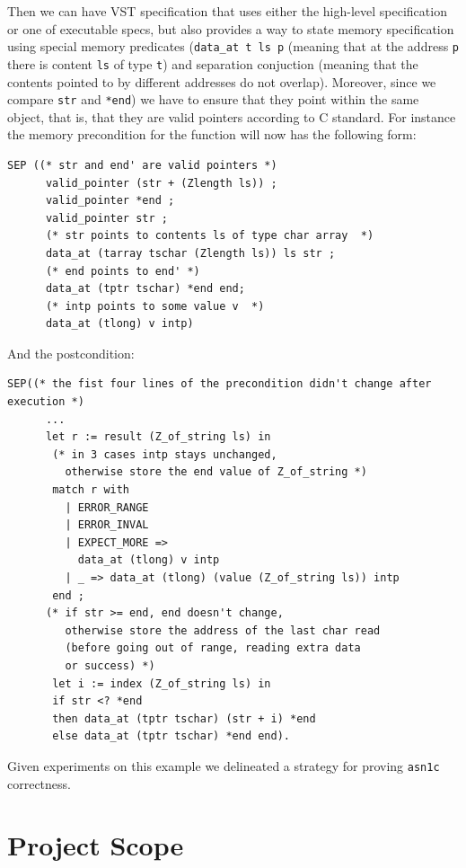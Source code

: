 \documentclass[acmsmall,nonacm]{acmart}
\begin{document}
Then we can have VST specification that uses either the high-level specification or one of executable specs, but also provides a way to state memory specification using special memory predicates (\texttt{data\_at t ls p} (meaning that at the address \texttt{p} there is content \texttt{ls} of type \texttt{t}) and separation conjuction (meaning that the contents pointed to by different addresses do not overlap). Moreover, since we compare \texttt{str} and \texttt{*end}) we have to ensure that they point within the same object, that is, that they are valid pointers according to C standard. For instance the memory precondition for the function will now has the following form:
\begin{lstlisting}[language=Coq]
SEP ((* str and end' are valid pointers *)
      valid_pointer (str + (Zlength ls)) ;
      valid_pointer *end ;
      valid_pointer str ;
      (* str points to contents ls of type char array  *)
      data_at (tarray tschar (Zlength ls)) ls str ; 
      (* end points to end' *)
      data_at (tptr tschar) *end end;
      (* intp points to some value v  *)
      data_at (tlong) v intp)
     \end{lstlisting}

And the postcondition:
           
\begin{lstlisting}[language=Coq]
 SEP((* the fist four lines of the precondition didn't change after execution *)
      ... 
      let r := result (Z_of_string ls) in
       (* in 3 cases intp stays unchanged,
         otherwise store the end value of Z_of_string *)
       match r with 
         | ERROR_RANGE 
         | ERROR_INVAL 
         | EXPECT_MORE => 
           data_at (tlong) v intp
         | _ => data_at (tlong) (value (Z_of_string ls)) intp 
       end ;
      (* if str >= end, end doesn't change, 
         otherwise store the address of the last char read 
         (before going out of range, reading extra data 
         or success) *)
       let i := index (Z_of_string ls) in
       if str <? *end
       then data_at (tptr tschar) (str + i) *end
       else data_at (tptr tschar) *end end).
\end{lstlisting}

Given experiments on this example we delineated a strategy for proving
\texttt{asn1c} correctness.

\section{Project Scope}
\end{document}
